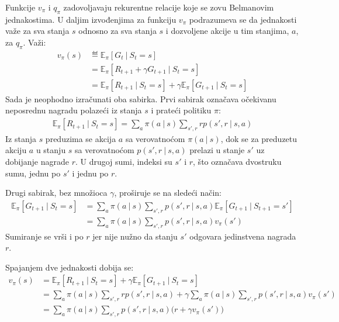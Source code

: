 Funkcije $v_{\pi}$ i $q_{\pi}$ zadovoljavaju rekurentne relacije koje se zovu Belmanovim jednakostima. U daljim izvođenjima za funkciju $v_{\pi}$ podrazumeva se da jednakosti važe za sva stanja $s$ odnosno za sva stanja $s$ i dozvoljene akcije u tim stanjima, $a$, za $q_{\pi}$. Važi:
\begin{equation}
	\begin{aligned}
		v_{\pi}(s) &\eqdef \mathbb{E}_{\pi}[G_t~|~S_t=s] \\ 
		&= \mathbb{E}_{\pi}[R_{t+1} + \gamma G_{t+1}~|~S_t=s] \\
		&= \mathbb{E}_{\pi}[R_{t+1}~|~S_t=s] + \gamma \mathbb{E}_{\pi}[G_{t+1}~|~S_t=s]
	\end{aligned}
\end{equation}
Sada je neophodno izračunati oba sabirka. Prvi sabirak označava očekivanu neposrednu nagradu polazeći iz stanja $s$ i prateći politiku $\pi$:
\begin{equation}
	\begin{aligned}
		\mathbb{E}_{\pi}[R_{t+1}~|~S_t=s] = \sum_{a}^{} \pi(a~|~s)\sum_{s', r}^{}rp(s', r~|~s, a)
	\end{aligned}
\end{equation}
Iz stanja $s$ preduzima se akcija $a$ sa verovatnoćom $\pi(a~|~s)$, dok se za preduzetu akciju $a$ u stanju $s$ sa verovatnoćom $p(s', r~|~s, a)$ prelazi u stanje $s'$ uz dobijanje nagrade $r$. U drugoj sumi, indeksi su $s'$ i $r$, što označava dvostruku sumu, jednu po $s'$ i jednu po $r$.
\par 
Drugi sabirak, bez množioca $\gamma$, proširuje se na sledeći način:
\begin{equation}
	\begin{aligned}
		\mathbb{E}_{\pi}[G_{t+1}~|~S_t=s] &= \sum_{a}^{} \pi(a~|~s)\sum_{s',r}^{}p(s', r~|~s, a)\mathbb{E}_{\pi}[G_{t+1}~|~S_{t+1}=s'] \\
		&= \sum_{a}^{} \pi(a~|~s)\sum_{s',r}^{}p(s', r~|~s, a)v_{\pi}(s')
	\end{aligned}
\end{equation}
Sumiranje se vrši i po $r$ jer nije nužno da stanju $s'$ odgovara jedinstvena nagrada $r$.
\par 
Spajanjem dve jednakosti dobija se:
\begin{equation}
	\label{eq:bel_v}
	\begin{aligned}
		v_{\pi}(s)  &= \mathbb{E}_{\pi}[R_{t+1}~|~S_t=s] + \gamma \mathbb{E}_{\pi}[G_{t+1}~|~S_t=s] \\
		&= \sum_{a}^{} \pi(a~|~s)\sum_{s', r}^{}rp(s', r~|~s, a) + \gamma \sum_{a}^{} \pi(a~|~s)\sum_{s',r}^{}p(s', r~|~s, a)v_{\pi}(s') \\
		&= \sum_{a}^{} \pi(a~|~s)\sum_{s', r}^{}p(s', r~|~s, a) \big( r+\gamma v_{\pi}(s') \big)
	\end{aligned}
\end{equation}
